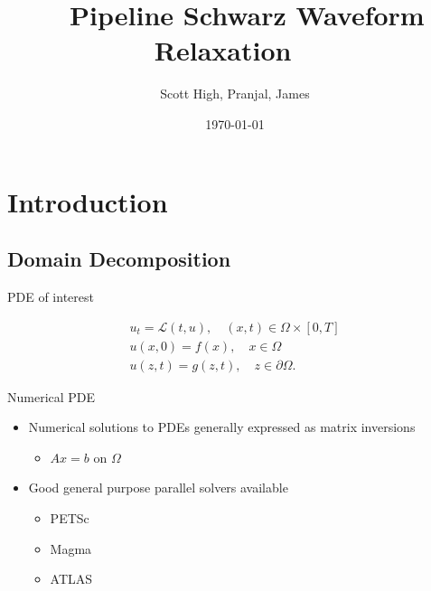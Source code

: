 \documentclass[]{beamer}
\title[Pipeline Schwarz Waveform Relaxation\hspace{1em}\insertframenumber/
\inserttotalframenumber]{~ Pipeline Schwarz Waveform Relaxation ~}
\author[Group 5]{Scott High, Pranjal, James}
\date{\today}
\begin{document}
\begin{frame}
  \maketitle
\end{frame}

\section{Introduction}

\subsection{Domain Decomposition}

\begin{frame}{PDE of interest}

  \begin{eqnarray}
    u_t =  \mathcal{L}(t,u), \quad (x,t)\in \Omega\times[0,T]\\
    \nonumber
    u(x,0) = f(x), \quad x \in \Omega \\
    \nonumber
    u(z,t) = g(z,t), \quad z \in \partial\Omega. 
  \end{eqnarray}

\end{frame}


\begin{frame}{Numerical PDE}

  \begin{itemize}
  \item<+-> Numerical solutions to PDEs generally expressed as matrix inversions
    \begin{itemize}
    \item $A x = b$ on $\Omega$
    \end{itemize}
  \item<+-> Good general purpose parallel solvers available
    \begin{itemize}
    \item PETSc
    \item Magma
    \item ATLAS
    \end{itemize}
  \end{itemize}

  \begin{figure}
    \centering
  \end{figure}

\end{frame}
\end{document}
